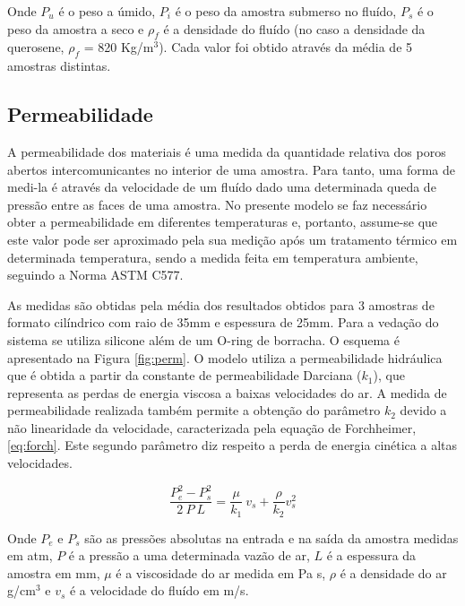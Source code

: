 Onde $P_u$ é o peso a úmido, $P_i$ é o peso da amostra submerso no fluído, $P_s$
é o peso da amostra a seco e $\rho_f$ é a densidade do fluído (no caso a
densidade da querosene, $\rho_f$ = 820 Kg/m$^3$). Cada valor foi obtido através
da média de 5 amostras distintas.
    
\subsection{Permeabilidade}\label{mat:perm}

A permeabilidade dos materiais é uma medida da quantidade relativa dos poros
abertos intercomunicantes no interior de uma amostra. Para tanto, uma forma de
medi-la é através da velocidade de um fluído dado uma determinada queda de
pressão entre as faces de uma amostra. No presente modelo se faz necessário
obter a permeabilidade em diferentes temperaturas e, portanto, assume-se que
este valor pode ser aproximado pela sua medição após um
tratamento térmico em determinada temperatura, sendo a medida feita em
temperatura ambiente, seguindo a Norma ASTM C577.

As medidas são obtidas pela média dos resultados obtidos para 3 amostras de
formato cilíndrico com raio de 35mm e espessura de 25mm. Para a vedação do
sistema se utiliza silicone além de um O-ring de borracha. O esquema é
apresentado na Figura \ref{fig:perm}. O modelo utiliza a permeabilidade
hidráulica que é obtida a partir da constante de permeabilidade Darciana
($k_1$), que representa as perdas de energia viscosa a baixas velocidades do ar.
A medida de permeabilidade realizada também permite a obtenção do parâmetro
$k_2$ devido a não linearidade da velocidade, caracterizada pela equação de
Forchheimer, \ref{eq:forch}. Este segundo parâmetro diz respeito a perda de
energia cinética a altas velocidades.

\begin{equation}
  \label{eq:forch}
  \frac{P_e^2 - P_s^2}{2 \ P \ L} = \frac{\mu}{k_1} \ v_s + \frac{\rho}{k_2}v_s^2
\end{equation}

Onde $P_e$ e $P_s$ são as pressões absolutas na entrada e na saída da amostra
medidas em atm, $P$ é a pressão a uma determinada vazão de ar, $L$ é a espessura
da amostra em mm, $\mu$ é a viscosidade do ar medida em Pa s, $\rho$ é a
densidade do ar g/cm$^3$ e $v_s$ é a velocidade do fluído em m/s.

